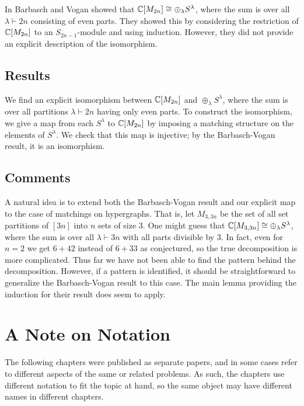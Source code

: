 In \cite{bv} Barbasch and Vogan showed that $\mathbb{C}[M_{2n}] \cong \oplus_\lambda S^\lambda$, where the sum is over all $\lambda \vdash 2n$ consisting of even parts.
They showed this by considering the restriction of $\mathbb{C}[M_{2n}]$ to an $S_{2n-1}$-module and using induction.
However, they did not provide an explicit description of the isomorphism.

\subsection{Results}
We find an explicit isomorphism between $\mathbb{C}[M_{2n}]$ and $\oplus_\lambda S^\lambda$, where the sum is over all partitions $\lambda \vdash 2n$ having only even parts.
To construct the isomorphism, we give a map from each $S^\lambda$ to $\mathbb{C}[M_{2n}]$ by imposing a matching structure on the elements of $S^\lambda$.
We check that this map is injective; by the Barbasch-Vogan result, it is an isomorphism.

\subsection{Comments}
A natural idea is to extend both the Barbasch-Vogan result and our explicit map to the case of matchings on hypergraphs.
That is, let $M_{3,3n}$ be the set of all set partitions of $[3n]$ into $n$ sets of size $3$.
One might guess that $\mathbb{C}[M_{3,3n}] \cong \oplus_\lambda S^\lambda$, where the sum is over all $\lambda \vdash 3n$ with all parts divisible by 3.
In fact, even for $n=2$ we get $6+42$ instead of $6+33$ as conjectured, so the true decomposition is more complicated.
Thus far we have not been able to find the pattern behind the decomposition.
However, if a pattern is identified, it should be straightforward to generalize the Barbasch-Vogan result to this case.
The main lemma providing the induction for their result does seem to apply.

\section{A Note on Notation}
The following chapters were published as separate papers, and in some cases refer to different aspects of the same or related problems. 
As such, the chapters use different notation to fit the topic at hand, so the same object may have different names in different chapters.
